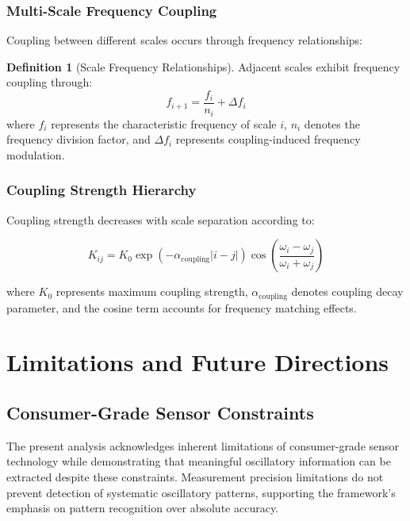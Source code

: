 \documentclass[12pt,a4paper]{article}
\theoremstyle{definition}
\newtheorem{definition}{Definition}[section]
\begin{document}
\subsubsection{Multi-Scale Frequency Coupling}

Coupling between different scales occurs through frequency relationships:

\begin{definition}[Scale Frequency Relationships]
Adjacent scales exhibit frequency coupling through:
\begin{equation}
f_{i+1} = \frac{f_i}{n_i} + \Delta f_i
\end{equation}
where $f_i$ represents the characteristic frequency of scale $i$, $n_i$ denotes the frequency division factor, and $\Delta f_i$ represents coupling-induced frequency modulation.
\end{definition}

\subsubsection{Coupling Strength Hierarchy}

Coupling strength decreases with scale separation according to:

\begin{equation}
K_{ij} = K_0 \exp\left(-\alpha_{\text{coupling}}|i-j|\right) \cos\left(\frac{\omega_i - \omega_j}{\omega_i + \omega_j}\right)
\end{equation}

where $K_0$ represents maximum coupling strength, $\alpha_{\text{coupling}}$ denotes coupling decay parameter, and the cosine term accounts for frequency matching effects.








\section{Limitations and Future Directions}

\subsection{Consumer-Grade Sensor Constraints}

The present analysis acknowledges inherent limitations of consumer-grade sensor technology while demonstrating that meaningful oscillatory information can be extracted despite these constraints. Measurement precision limitations do not prevent detection of systematic oscillatory patterns, supporting the framework's emphasis on pattern recognition over absolute accuracy.
\end{document}
